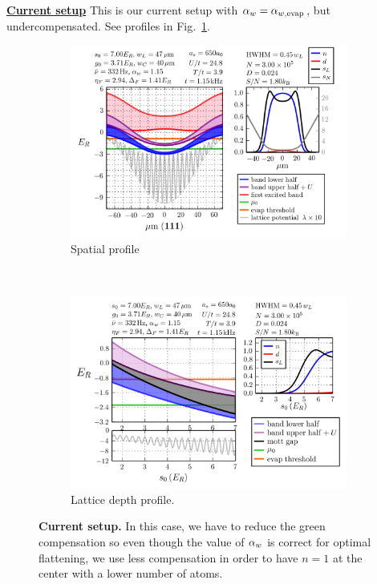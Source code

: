 \vspace{-2em}
\begin{myblock} 
  \underline{ \textbf{Current setup}} \newline  This is our current setup
with $ \alpha_{w} =  \alpha_{w,\text{evap}} $,  but undercompensated. See profiles in Fig.~\ref{fig:compare03}.
\end{myblock} 
\begin{figure}
        \centering
        \begin{subfigure}[t]{0.49\textwidth}
		\includegraphics[width=\textwidth]{../figures/lda_evap/figures_hubbard-lda/Flat/009.png}
\caption{Spatial profile }
        \end{subfigure}%
        ~~ %
        \begin{subfigure}[t]{0.49\textwidth}
		\includegraphics[width=\textwidth]{../figures/lda_evap/figures_hubbard-lda/Flat/Mathy/009.png}
\caption{Lattice depth profile.}
        \end{subfigure}
	\caption{ \textbf{Current setup.}  In this case, we have to reduce the
green compensation so even though the value of $ \alpha_{w} $ is correct for optimal
flattening, we use less compensation in order to have $n=1$ at the center with
a lower number of atoms.  }
\label{fig:compare03}
\end{figure}
 
